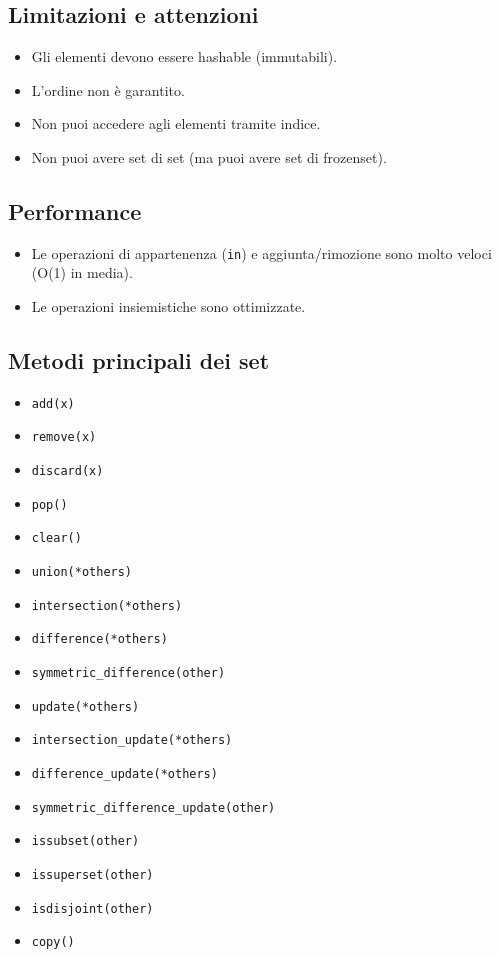 \documentclass[a4paper,12pt]{article}
\begin{document}
\subsection*{Limitazioni e attenzioni}
\begin{itemize}
    \item Gli elementi devono essere hashable (immutabili).
    \item L'ordine non è garantito.
    \item Non puoi accedere agli elementi tramite indice.
    \item Non puoi avere set di set (ma puoi avere set di frozenset).
\end{itemize}

\subsection*{Performance}
\begin{itemize}
    \item Le operazioni di appartenenza (\texttt{in}) e aggiunta/rimozione sono molto veloci (O(1) in media).
    \item Le operazioni insiemistiche sono ottimizzate.
\end{itemize}

\subsection*{Metodi principali dei set}
\begin{multicols}{2}
\begin{itemize}
    \item \texttt{add(x)}
    \item \texttt{remove(x)}
    \item \texttt{discard(x)}
    \item \texttt{pop()}
    \item \texttt{clear()}
    \item \texttt{union(*others)}
    \item \texttt{intersection(*others)}
    \item \texttt{difference(*others)}
    \item \texttt{symmetric\_difference(other)}
    \item \texttt{update(*others)}
    \item \texttt{intersection\_update(*others)}
    \item \texttt{difference\_update(*others)}
    \item \texttt{symmetric\_difference\_update(other)}
    \item \texttt{issubset(other)}
    \item \texttt{issuperset(other)}
    \item \texttt{isdisjoint(other)}
    \item \texttt{copy()}
\end{itemize}
\end{multicols}
\end{document}
